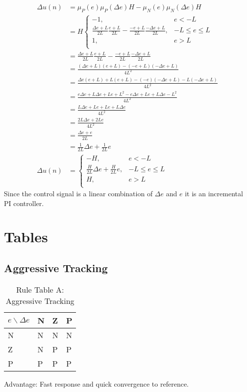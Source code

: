 \begin{equation}
\begin{split}
    \Delta u(n)&=\mu_P(e) \mu_P (\Delta e)H-\mu_N(e) \mu_N (\Delta e)H\\
    &=H\begin{cases}
    -1,& e<-L\\
    \frac{\Delta e+L}{2L}\frac{e+L}{2L}-\frac{-e+L}{2L}\frac{-\Delta e+L}{2L},& -L\leq e\leq L\\
    1,& e>L\\
    \end{cases}\\
    &=\frac{\Delta e+L}{2L}\frac{e+L}{2L}-\frac{-e+L}{2L}\frac{-\Delta e+L}{2L}\\
    &=\frac{(\Delta e+L)(e+L)-(-e+L)(-\Delta e+L)}{4L^2}\\
    &=\frac{\Delta e(e+L)+L(e+L)-(-e)(-\Delta e+L)-L(-\Delta e+L)}{4L^2}\\
    &=\frac{e\Delta e+L\Delta e+Le+L^2-e\Delta e+Le+L\Delta e-L^2}{4L^2}\\
    &=\frac{L\Delta e+Le+Le+L\Delta e}{4L^2}\\
    &=\frac{2L\Delta e+2Le}{4L^2}\\
    &=\frac{\Delta e+e}{2L}\\
    &=\frac{1}{2L}\Delta e+\frac{1}{2L}e\\
    \Delta u(n)&=\begin{cases}
    -H,& e<-L\\
    \frac{H}{2L}\Delta e+\frac{H}{2L}e,& -L\leq e\leq L\\
    H,& e>L\\
    \end{cases}
\end{split}
\end{equation}
Since the control signal is a linear combination of $\Delta e$ and $e$ it is an incremental PI controller.

\section{Tables}
\subsection{Aggressive Tracking}
\begin{table}[h]
\centering
\caption{Rule Table A: Aggressive Tracking}
\begin{tabular}{llll}
\toprule
{$e\backslash \Delta e$} & N & Z & P \\
\midrule
N & N & N & N \\
Z & N & P & P \\
P & P & P & P \\
\bottomrule
\end{tabular}
\end{table}
Advantage: Fast response and quick convergence to reference.

